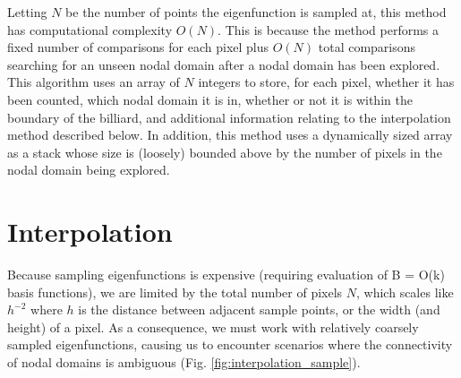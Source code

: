 \documentclass{report}
\begin{document}
Letting $N$ be the number of points the eigenfunction is sampled at, this method has computational complexity $O(N)$. This is because the method performs a fixed number of comparisons for each pixel plus $O(N)$ total comparisons searching for an unseen nodal domain after a nodal domain has been explored. This algorithm uses an array of $N$ integers to store, for each pixel, whether it has been counted, which nodal domain it is in, whether or not it is within the boundary of the billiard, and additional information relating to the interpolation method described below. In addition, this method uses a dynamically sized array as a stack whose size is (loosely) bounded above by the number of pixels in the nodal domain being explored.

\section{Interpolation}
\label{sec:interpolation}
Because sampling eigenfunctions is expensive (requiring evaluation of B = O(k) basis functions), we are limited by the total number of pixels $N$, which scales like $h^{-2}$ where $h$ is the distance between adjacent sample points, or the width (and height) of a pixel. As a consequence, we must work with relatively coarsely sampled eigenfunctions, causing us to encounter scenarios where the connectivity of nodal domains is ambiguous (Fig. \ref{fig:interpolation_sample}).
\end{document}
